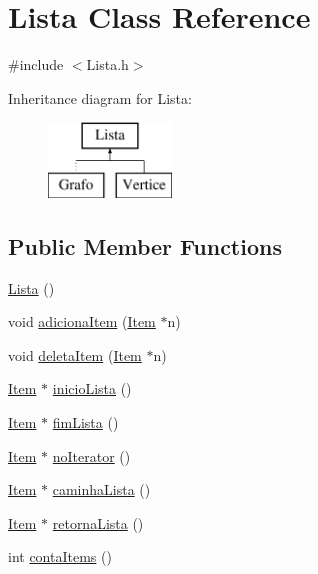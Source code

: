 \hypertarget{class_lista}{\section{Lista Class Reference}
\label{class_lista}
}


{\ttfamily \#include $<$Lista.\-h$>$}

Inheritance diagram for Lista\-:\begin{figure}[H]
\begin{center}
\leavevmode
\includegraphics[height=2.000000cm]{class_lista}
\end{center}
\end{figure}
\subsection*{Public Member Functions}
\begin{DoxyCompactItemize}
\item 
\hyperlink{class_lista_a1f668b36909182ef1360b48503529a31}{Lista} ()
\item 
void \hyperlink{class_lista_a0b1e9b3728bd4b9c6ef2d9c095dbb4f4}{adiciona\-Item} (\hyperlink{class_item}{Item} $\ast$n)
\item 
void \hyperlink{class_lista_a32622b53bc0720338439beecd0e7972f}{deleta\-Item} (\hyperlink{class_item}{Item} $\ast$n)
\item 
\hyperlink{class_item}{Item} $\ast$ \hyperlink{class_lista_a21093c5b211072af96f8fda2e5739773}{inicio\-Lista} ()
\item 
\hyperlink{class_item}{Item} $\ast$ \hyperlink{class_lista_a92efd69dea7b9b4caffcf9ebf12825ef}{fim\-Lista} ()
\item 
\hyperlink{class_item}{Item} $\ast$ \hyperlink{class_lista_afd444ac095ae137b6b43e5e575e54864}{no\-Iterator} ()
\item 
\hyperlink{class_item}{Item} $\ast$ \hyperlink{class_lista_acc446a0d931b922cbdf4a61794afe658}{caminha\-Lista} ()
\item 
\hyperlink{class_item}{Item} $\ast$ \hyperlink{class_lista_aabb1d795e42a01bb8c4d3271a922ed09}{retorna\-Lista} ()
\item 
int \hyperlink{class_lista_ae006b01ac1cb5d6aba47acdc410db3f0}{conta\-Items} ()
\end{DoxyCompactItemize}
